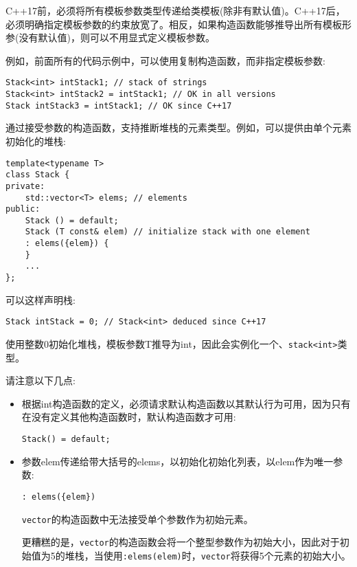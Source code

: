 C++17前，必须将所有模板参数类型传递给类模板(除非有默认值)。C++17后，必须明确指定模板参数的约束放宽了。相反，如果构造函数能够推导出所有模板形参(没有默认值)，则可以不用显式定义模板参数。

例如，前面所有的代码示例中，可以使用复制构造函数，而非指定模板参数:

\begin{lstlisting}[style=styleCXX]
Stack<int> intStack1; // stack of strings
Stack<int> intStack2 = intStack1; // OK in all versions
Stack intStack3 = intStack1; // OK since C++17
\end{lstlisting}

通过接受参数的构造函数，支持推断堆栈的元素类型。例如，可以提供由单个元素初始化的堆栈:

\begin{lstlisting}[style=styleCXX]
template<typename T>
class Stack {
private:
	std::vector<T> elems; // elements
public:
	Stack () = default;
	Stack (T const& elem) // initialize stack with one element
	: elems({elem}) {
	}
	...
};
\end{lstlisting}

可以这样声明栈:

\begin{lstlisting}[style=styleCXX]
Stack intStack = 0; // Stack<int> deduced since C++17
\end{lstlisting}

使用整数0初始化堆栈，模板参数T推导为int，因此会实例化一个、\texttt{stack<int>}类型。

请注意以下几点:

\begin{itemize}
\item 
根据int构造函数的定义，必须请求默认构造函数以其默认行为可用，因为只有在没有定义其他构造函数时，默认构造函数才可用:
\begin{lstlisting}[style=styleCXX]
Stack() = default;
\end{lstlisting}

\item 
参数elem传递给带大括号的elems，以初始化初始化列表，以elem作为唯一参数:
\begin{lstlisting}[style=styleCXX]
: elems({elem})
\end{lstlisting}
\texttt{vector}的构造函数中无法接受单个参数作为初始元素。

\begin{tcolorbox}[colback=webgreen!5!white,colframe=webgreen!75!black]
\hspace*{0.75cm}更糟糕的是，\texttt{vector}的构造函数会将一个整型参数作为初始大小，因此对于初始值为5的堆栈，当使用\texttt{:elems(elem)}时，\texttt{vector}将获得5个元素的初始大小。
\end{tcolorbox}

\end{itemize}

